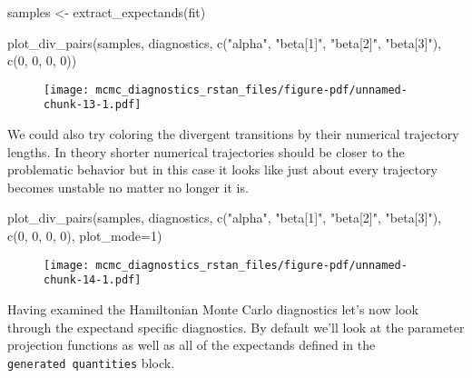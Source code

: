 \documentclass[
  letterpaper,
  DIV=11,
  numbers=noendperiod]{scrartcl}
\newenvironment{Shaded}{\begin{snugshade}}{\end{snugshade}}
\newcommand{\AttributeTok}[1]{\textcolor[rgb]{0.40,0.45,0.13}{#1}}
\newcommand{\DecValTok}[1]{\textcolor[rgb]{0.68,0.00,0.00}{#1}}
\newcommand{\FunctionTok}[1]{\textcolor[rgb]{0.28,0.35,0.67}{#1}}
\newcommand{\NormalTok}[1]{\textcolor[rgb]{0.00,0.23,0.31}{#1}}
\newcommand{\OtherTok}[1]{\textcolor[rgb]{0.00,0.23,0.31}{#1}}
\newcommand{\StringTok}[1]{\textcolor[rgb]{0.13,0.47,0.30}{#1}}
\begin{document}
\begin{Shaded}
\begin{Highlighting}[]
\NormalTok{samples }\OtherTok{\textless{}{-}} \FunctionTok{extract\_expectands}\NormalTok{(fit)}

\FunctionTok{plot\_div\_pairs}\NormalTok{(samples, diagnostics, }
               \FunctionTok{c}\NormalTok{(}\StringTok{"alpha"}\NormalTok{, }\StringTok{"beta[1]"}\NormalTok{, }\StringTok{"beta[2]"}\NormalTok{, }\StringTok{"beta[3]"}\NormalTok{),}
               \FunctionTok{c}\NormalTok{(}\DecValTok{0}\NormalTok{, }\DecValTok{0}\NormalTok{, }\DecValTok{0}\NormalTok{, }\DecValTok{0}\NormalTok{))}
\end{Highlighting}
\end{Shaded}

\begin{figure}[H]

{\centering \texttt{[image: mcmc\_diagnostics\_rstan\_files/figure-pdf/unnamed-chunk-13-1.pdf]}

}

\end{figure}

We could also try coloring the divergent transitions by their numerical
trajectory lengths. In theory shorter numerical trajectories should be
closer to the problematic behavior but in this case it looks like just
about every trajectory becomes unstable no matter no longer it is.

\begin{Shaded}
\begin{Highlighting}[]
\FunctionTok{plot\_div\_pairs}\NormalTok{(samples, diagnostics, }
               \FunctionTok{c}\NormalTok{(}\StringTok{"alpha"}\NormalTok{, }\StringTok{"beta[1]"}\NormalTok{, }\StringTok{"beta[2]"}\NormalTok{, }\StringTok{"beta[3]"}\NormalTok{),}
               \FunctionTok{c}\NormalTok{(}\DecValTok{0}\NormalTok{, }\DecValTok{0}\NormalTok{, }\DecValTok{0}\NormalTok{, }\DecValTok{0}\NormalTok{), }\AttributeTok{plot\_mode=}\DecValTok{1}\NormalTok{)}
\end{Highlighting}
\end{Shaded}

\begin{figure}[H]

{\centering \texttt{[image: mcmc\_diagnostics\_rstan\_files/figure-pdf/unnamed-chunk-14-1.pdf]}

}

\end{figure}

Having examined the Hamiltonian Monte Carlo diagnostics let's now look
through the expectand specific diagnostics. By default we'll look at the
parameter projection functions as well as all of the expectands defined
in the \texttt{generated\ quantities} block.
\end{document}
